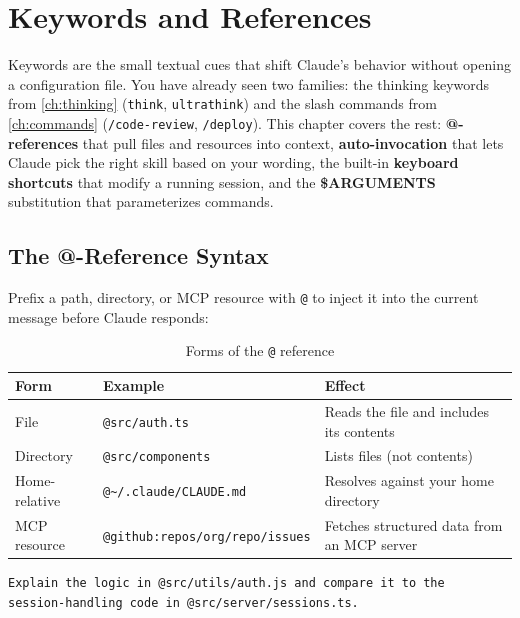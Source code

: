 \chapter{Keywords and References}
\label{ch:keywords}


Keywords are the small textual cues that shift Claude's behavior without
opening a configuration file. You have already seen two families: the
thinking keywords from \cref{ch:thinking} (\texttt{think},
\texttt{ultrathink}) and the slash commands from \cref{ch:commands}
(\texttt{/code-review}, \texttt{/deploy}). This chapter covers the rest:
\textbf{@-references} that pull files and resources into context,
\textbf{auto-invocation} that lets Claude pick the right skill based on
your wording, the built-in \textbf{keyboard shortcuts} that modify a
running session, and the \textbf{\$ARGUMENTS} substitution that
parameterizes commands.

\section{The @-Reference Syntax}
\label{sec:at-references}


Prefix a path, directory, or MCP resource with \texttt{@} to inject it
into the current message before Claude responds:

\begin{table}[ht]
\centering
\caption{Forms of the \texttt{@} reference}
\label{tab:at-references}
\begin{tabularx}{\textwidth}{lXX}
\toprule
\textbf{Form} & \textbf{Example} & \textbf{Effect} \\
\midrule
File          & \texttt{@src/auth.ts}
              & Reads the file and includes its contents \\
Directory     & \texttt{@src/components}
              & Lists files (not contents) \\
Home-relative & \texttt{@\textasciitilde/.claude/CLAUDE.md}
              & Resolves against your home directory \\
MCP resource  & \texttt{@github:repos/org/repo/issues}
              & Fetches structured data from an MCP server \\
\bottomrule
\end{tabularx}
\end{table}

\begin{lstlisting}[caption={Using \texttt{@} references in a prompt}]
Explain the logic in @src/utils/auth.js and compare it to the
session-handling code in @src/server/sessions.ts.
\end{lstlisting}


